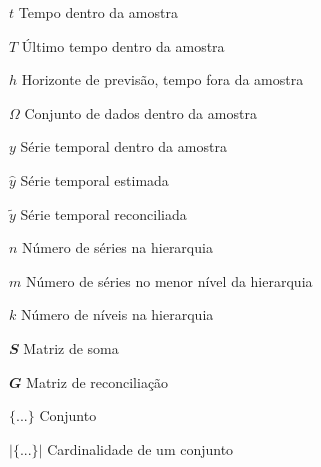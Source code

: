 \begin{simbolos}
  \item[$ t $] Tempo dentro da amostra
  \item[$ T $] Último tempo dentro da amostra
  \item[$ h $] Horizonte de previsão, tempo fora da amostra
  \item[$ \Omega $] Conjunto de dados dentro da amostra
  \item[$ y $] Série temporal dentro da amostra
  \item[$ \hat{y} $] Série temporal estimada
  \item[$ \tilde{y} $] Série temporal reconciliada
  \item[$ n $] Número de séries na hierarquia
  \item[$ m $] Número de séries no menor nível da hierarquia
  \item[$ k $] Número de níveis na hierarquia
  \item[$ \mathbfit{S} $] Matriz de soma
  \item[$ \mathbfit{G} $] Matriz de reconciliação
  \item[$ \{...\} $] Conjunto
  \item[$ |\{...\}| $] Cardinalidade de um conjunto
\end{simbolos}

\tableofcontents*
\cleardoublepage

\textual
\pagestyle{simple}